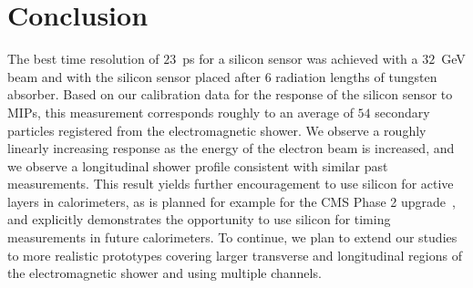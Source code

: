 \section{Conclusion}\label{cal-sum} 
The best time resolution of $23$~ps for a silicon sensor was achieved with a $32$~GeV beam 
and with the silicon sensor placed after 6 radiation
lengths of tungsten absorber. Based on our calibration data for the response of the
silicon sensor to MIPs, this measurement corresponds roughly to 
an average of $54$ secondary particles registered from the electromagnetic shower. 
We observe a roughly linearly increasing response as the energy of the electron beam
is increased, and we observe a longitudinal shower profile consistent with similar 
past measurements. This result yields further encouragement to use silicon for 
active layers in calorimeters, as is planned for example for the CMS Phase 2 
upgrade~\cite{Butler:2020886}, and explicitly demonstrates the opportunity 
to use silicon for timing measurements in future calorimeters. To continue, we plan to 
extend our studies to more realistic prototypes covering larger transverse and longitudinal 
regions of the electromagnetic shower and using multiple channels. 



